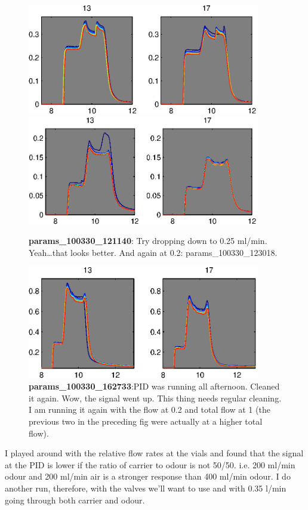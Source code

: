 \documentclass[a4paper]{report}
\begin{document}
\begin{figure}[h]
\centering
\includegraphics[width=4in]{params_100330_121140.eps}
\includegraphics[width=4in]{params_100330_123018.eps}
\caption{\textbf{params\_100330\_121140}: Try dropping down to 0.25
  ml/min. Yeah\ldots that looks better. 
And again at 0.2: params\_100330\_123018. }
\end{figure}




\begin{figure}[h]
\centering
\includegraphics[width=4in]{params_100330_162733.eps}
\caption{\textbf{params\_100330\_162733}:PID was running all
  afternoon. Cleaned it again. Wow, the signal went up. This thing
  needs regular cleaning. I am running it again with the flow at 0.2
  and total flow at 1 (the previous two in the preceding fig were
  actually at a higher total flow).  }
\end{figure}

I played around with the relative flow rates at the vials and found
that the signal at the PID is lower if the ratio of carrier to odour
is not 50/50. i.e. 200 ml/min odour and 200 ml/min air is a stronger
response than 400 ml/min odour. I do another run, therefore, with the
valves we'll want to use and with 0.35 l/min going through both
carrier and odour. 
\end{document}
